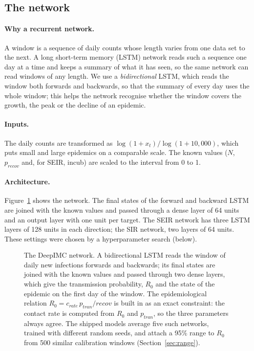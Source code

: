 \documentclass[12pt]{article}
\begin{document}
\subsection{The network}\label{sec:network}

\paragraph{Why a recurrent network.} A window is a sequence of daily counts whose length varies from
one data set to the next. A long short-term memory (LSTM) network \autocite{hochreiter1997long} reads
such a sequence one day at a time and keeps a summary of what it has seen, so the same network can
read windows of any length. We use a \emph{bidirectional} LSTM, which reads the window both forwards
and backwards, so that the summary of every day uses the whole window; this helps the network
recognise whether the window covers the growth, the peak or the decline of an epidemic.

\paragraph{Inputs.} The daily counts are transformed as $\log(1 + x_t)/\log(1 + 10{,}000)$, which puts
small and large epidemics on a comparable scale. The known values ($N$, $p_{recov}$ and, for SEIR,
incub) are scaled to the interval from 0 to 1.

\paragraph{Architecture.} Figure~\ref{fig:architecture} shows the network. The final states of the forward and backward LSTM are joined with the known
values and passed through a dense layer of 64 units and an output layer with one unit per target.
The SEIR network has three LSTM layers of 128 units in each direction; the SIR network, two layers of
64 units. These settings were chosen by a hyperparameter search (below).

\begin{figure}[htbp]
\centering
\resizebox{\textwidth}{!}{}
\caption{The DeepIMC network. A bidirectional LSTM reads the window of daily new infections forwards and
backwards; its final states are joined with the known values and passed through two dense layers, which
give the transmission probability, $R_0$ and the state of the epidemic on the first day of the window. The
epidemiological relation $R_0 = c_{rate}\,p_{tran}/recov$ is built in as an exact constraint: the contact
rate is computed from $R_0$ and $p_{tran}$, so the three parameters always agree. The shipped models average five such networks, trained with
different random seeds, and attach a 95\% range to $R_0$ from 500 similar calibration windows
(Section~\ref{sec:range}).}
\label{fig:architecture}
\end{figure}
\end{document}
